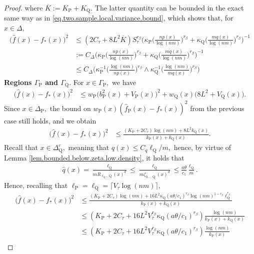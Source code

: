 \documentclass[10pt]{article}
\renewcommand{\P}{\operatorname{P}}
\newcommand{\Q}{\operatorname{Q}}
\renewcommand{\k}{\kappa}
\newcommand{\wh}{\widehat}
\newcommand{\ol}{\overline}
\begin{document}
\begin{proof}
    where $\ol K := K_{\P} + K_{\Q}.$ The latter quantity can be bounded in the exact same way as in \eqref{eq.two.sample.local.variance.bound}, which shows that, for $x \in \Delta,$
    \begin{align*}
        \big(\wh f(x) - f_*(x)\big)^2 &\leq (2C_\tau + 8L^2\ol K)S_\tau^{r_\beta} \Bigg(\k_{\P}\bigg(\frac{np(x)}{\log(nm)}\bigg)^{r_\beta} + \k_{\Q}\bigg(\frac{m q(x)}{\log(nm)}\bigg)^{r_\beta}\Bigg)^{-1}\\
        &:= C_{\Delta}\Bigg(\k_{\P}\bigg(\frac{np(x)}{\log(nm)}\bigg)^{r_\beta} + \k_{\Q}\bigg(\frac{m q(x)}{\log(nm)}\bigg)^{r_\beta}\Bigg)^{-1}\\
        &\leq C_{\Delta}\bigg(\k_{\P}^{-1}\Big(\frac{\log(nm)}{np(x)}\Big)^{r_\beta}\wedge\k_{\Q}^{-1}\Big(\frac{\log(nm)}{mq(x)}\Big)^{r_\beta}\bigg)
    \end{align*}
    \noindent\textbf{Regions $\Gamma_{\P}$ and $\Gamma_{\Q}.$} For $x \in \Gamma_{\P},$ we have
    \begin{align*}
        \big(\wh f(x) - f_*(x)\big)^2 &\leq w_{\P}\big(b_{\P}^2(x) + V_{\P}(x)\big)^2 + w_{\Q}(x)\big(8L^2 + V_{\Q}(x)\big).
    \end{align*}
    Since $x \in \Delta_{\P},$ the bound on $w_{\P}(x)(\wh f_{\P}(x) - f_*(x))^2$ from the previous case still holds, and we obtain
    \begin{align*}
        \big(\wh f(x) - f_*(x)\big)^2 &\leq \frac{(K_{\P} + 2C_\tau) \log(nm) + 8L^2k_{\Q}(x)}{k_{\P}(x) + k_{\Q}(x)}.
    \end{align*}
    Recall that $x \in \Delta_{\Q}^c,$ meaning that $q(x) \leq C_q\ell_{\Q}/m,$ hence, by virtue of Lemma \ref{lem.bounded.below.zeta.low.density}, it holds that
    \begin{align}
        \label{eq.ub.wh.q.low.density}
        \wh q(x) = \frac{\ell_{\Q}}{mR_{\ell_{\Q}, \Q}(x)^d} \leq \frac{\ell_{\Q}}{m\zeta_{h_-, \Q}(x)^d} \leq \frac{a\theta}{c_1}\frac{\ell_{\Q}}{m}.
    \end{align}
    Hence, recalling that $\ell_{\P} = \ell_{\Q} = \lceil V_\tau \log(nm)\rceil,$
    \begin{align*}
        \big(\wh f(x) - f_*(x)\big)^2 &\leq \frac{(K_{\P} + 2C_\tau) \log(nm) + 16L^2\k_{\Q}(a\theta/c_1)^{r_\beta}\log(nm)^{1-r_\beta}\ell_{\Q}^{r_\beta}}{k_{\P}(x) + k_{\Q}(x)}\\
        &\leq (K_{\P} + 2C_\tau + 16L^2V_\tau^{r_\beta}\k_{\Q}(a\theta/c_1)^{r_\beta}) \frac{\log(nm)}{k_{\P}(x) + k_{\Q}(x)}\\
        &\leq (K_{\P} + 2C_\tau + 16L^2V_\tau^{r_\beta}\k_{\Q}(a\theta/c_1)^{r_\beta})\frac{\log(nm)}{k_{\P}(x)}\\

\end{align*}
\end{proof}
\end{document}
